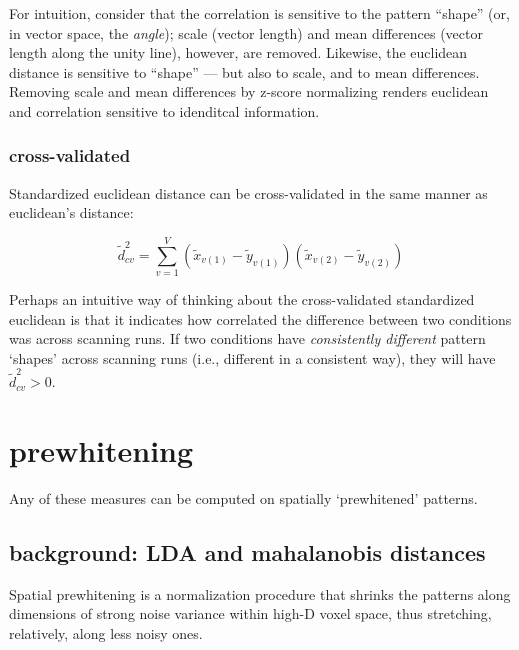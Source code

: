 \documentclass{article}\usepackage[]{graphicx}\usepackage[]{color}
\begin{document}
For intuition, consider that the correlation is sensitive to the pattern ``shape'' (or, in vector space, the \textit{angle}); scale (vector length) and mean differences (vector length along the unity line), however, are removed.
Likewise, the euclidean distance is sensitive to ``shape'' --- but also to scale, and to mean differences.
Removing scale and mean differences by z-score normalizing renders euclidean and correlation sensitive to idenditcal information.

\subsubsection*{cross-validated}

Standardized euclidean distance can be cross-validated in the same manner as euclidean's distance:

\begin{equation}
  \widetilde{d}^2_\textit{cv} = \sum_{v = 1}^{V}(\widetilde{x}_{v(1)} - \widetilde{y}_{v(1)})(\widetilde{x}_{v(2)} - \widetilde{y}_{v(2)})
\end{equation}

Perhaps an intuitive way of thinking about the cross-validated standardized euclidean is that it indicates how correlated the difference between two conditions was across scanning runs.
If two conditions have \textit{consistently different} pattern `shapes' across scanning runs (i.e., different in a consistent way), they will have $\widetilde{d}^2_\textit{cv} > 0$.

\section*{prewhitening}

Any of these measures can be computed on spatially `prewhitened' patterns.

\subsection*{background: LDA and mahalanobis distances}

Spatial prewhitening is a normalization procedure that shrinks the patterns along dimensions of strong noise variance within high-D voxel space, thus stretching, relatively, along less noisy ones.
\end{document}
